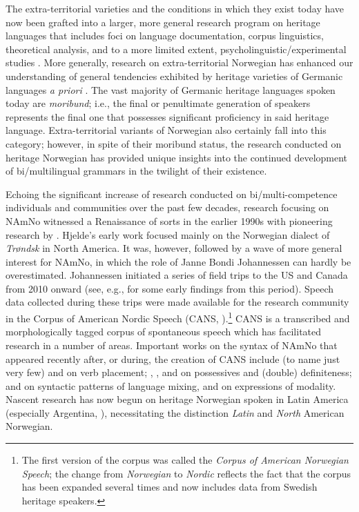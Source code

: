 \documentclass[output=paper,colorlinks,citecolor=brown]{langscibook}
\begin{document}
The extra-territorial varieties and the conditions in which they exist today have now been grafted into a larger, more general research program on heritage languages that includes foci on language documentation, corpus linguistics, theoretical analysis, and to a more limited extent, psycholinguistic/experimental studies \citep{adamou21}. More generally, research on extra-territorial Norwegian has enhanced our understanding of general tendencies exhibited by heritage varieties of Germanic languages \textit{a priori} \citep{jannejoe15,jannemike20,jannejoe21,pageput15}. The vast majority of Germanic heritage languages spoken today are \textit{moribund}; i.e., the final or penultimate generation of speakers represents the final one that possesses significant proficiency in said heritage language. Extra-territorial variants of Norwegian also certainly fall into this category; however, in spite of their moribund status, the research conducted on heritage Norwegian has provided unique insights into the continued development of bi/multilingual grammars in the twilight of their existence. 

Echoing the significant increase of research conducted on bi\slash multi\hyp competence individuals and communities over the past few decades, research focusing on NAmNo witnessed a Renaissance of sorts in the earlier 1990s with pioneering research by \citet{hjelde1992trondsk}. Hjelde's early work focused mainly on the Norwegian dialect of \emph{Trøndsk} in North America. It was, however, followed by a wave of more general interest for NAmNo, in which the role of Janne Bondi Johannessen can hardly be overestimated. Johannessen initiated a  series of field trips to the US and Canada from 2010 onward (see, e.g., \citealt{johannessenlaake2012tomyter} for some early findings from this period). Speech data collected during these trips were made available for the research community in the Corpus of American Nordic Speech (CANS, \citealt{johannessen2015cans}).\footnote{The first version of the corpus was called the \emph{Corpus of American Norwegian Speech}; the  change from \emph{Norwegian} to \emph{Nordic} reflects the fact that the corpus has been expanded several times and now includes data from Swedish heritage speakers.} CANS is a transcribed and  morphologically tagged corpus of spontaneous speech which has facilitated research in a number of areas. Important works on the syntax of NAmNo that appeared recently after, or during, the creation of CANS include (to name just very few) \citet{larssonjohannessen2015incomplete}  and \citet{westergaardlohndal2019verbsecond} on verb placement; \citet{anderssenwestergaard2012tospraklighet}, \citet{anderssenetal2018cross-linguistic}, and  \citet{vanbaal2020thesis} on possessives and (double) definiteness; \citet{riksem2017phd} and \citet{riksemetal2019languagemixing} on syntactic patterns of language mixing, and \citet{eidekristinmelumhjeldearnstein} on expressions of modality. Nascent research has now begun on heritage Norwegian spoken in Latin America (especially Argentina, \citealt{kinnetal2024latamnoNLT, kinnetal2024argnowila}), necessitating the distinction \textit{Latin} and \textit{North} American Norwegian.
\end{document}
